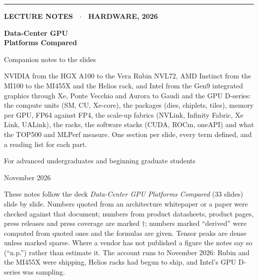 \documentclass[11pt,letterpaper]{article}
\begin{document}
\begin{titlepage}
\thispagestyle{empty}
\vspace*{2.5cm}
{\color{attn}\rule{3cm}{3pt}}\par\vspace{0.6cm}
{\sffamily\bfseries\color{muted}\large LECTURE NOTES \ $\cdot$ \ HARDWARE, 2026\par}
\vspace{0.4cm}
{\sffamily\bfseries\fontsize{30}{34}\selectfont\color{ink} Data-Center GPU\\Platforms Compared\par}
\vspace{0.3cm}
{\sffamily\fontsize{18}{22}\selectfont\color{ink} Companion notes to the slides\par}
\vspace{1.2cm}
{\large\color{muted}\parbox{0.82\textwidth}{NVIDIA from the HGX A100 to the Vera Rubin NVL72, AMD Instinct from the MI100 to the MI455X and the Helios rack, and Intel from the Gen9 integrated graphics through Xe, Ponte Vecchio and Aurora to Gaudi and the GPU D-series: the compute units (SM, CU, Xe-core), the packages (dies, chiplets, tiles), memory per GPU, FP64 against FP4, the scale-up fabrics (NVLink, Infinity Fabric, Xe Link, UALink), the racks, the software stacks (CUDA, ROCm, oneAPI) and what the TOP500 and MLPerf measure. One section per slide, every term defined, and a reading list for each part.}\par}
\vspace{1.5cm}
{\color{muted}For advanced undergraduates and beginning graduate students\par}
\vspace{0.3cm}
{\color{muted}November 2026\par}
\vfill
{\small\color{muted}\parbox{0.9\textwidth}{These notes follow the deck \textit{Data-Center GPU Platforms Compared} (33 slides) slide by slide. Numbers quoted from an architecture whitepaper or a paper were checked against that document; numbers from product datasheets, product pages, press releases and press coverage are marked $\dagger$; numbers marked ``derived'' were computed from quoted ones and the formulas are given. Tensor peaks are dense unless marked sparse. Where a vendor has not published a figure the notes say so (``n.p.'') rather than estimate it. The account runs to November 2026: Rubin and the MI455X were shipping, Helios racks had begun to ship, and Intel's GPU D-series was sampling.}\par}
\end{titlepage}
\end{document}
